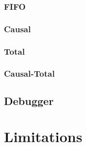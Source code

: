 \documentclass[titlepage, twocolumn, a4paper, 10pt]{article}
\begin{document}
\subsubsection{FIFO}\label{sec:fifo}
\subsubsection{Causal}\label{sec:causal}
\subsubsection{Total}\label{sec:total}
\subsubsection{Causal-Total}\label{sec:causal-total}


\subsection{Debugger}\label{sec:debugger}





\section{Limitations}\label{sec:limitations}

\end{document}
